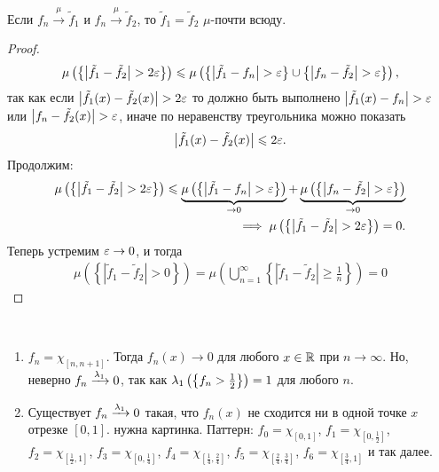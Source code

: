 \begin{remrk}
 Если $f_n \xrightarrow{\mu} \tilde f_1$ и $f_n \xrightarrow{\mu} \tilde f_2$, то $\tilde f_1 = \tilde f_2$  $\mu$-почти всюду.
\end{remrk}
\begin{proof}
 \begin{align*}
  \mu \left( \left\{ \left| \tilde f_1 - \tilde f_2 \right| > 2\varepsilon \right\} \right)\leqslant \mu \left( \left\{ \left| \tilde f_1 - f_n \right| > \varepsilon \right\} \cup \left\{ \left| f_n - \tilde f_2 \right| > \varepsilon \right\} \right)
 ,\end{align*} так как если  $\left| \tilde f_1(x) - \tilde f_2(x) \right| > 2\varepsilon$ то должно быть выполнено $\left| \tilde f_1(x) - f_n \right| > \varepsilon$ или $\left| f_n - \tilde f_2(x) \right| > \varepsilon$, иначе по неравенству треугольника можно показать 
\begin{align*}
\left| \tilde f_1(x) - \tilde f_2(x) \right| \leqslant 2\varepsilon
.\end{align*} Продолжим: \begin{align*}
\mu \left( \left\{ \left| \tilde f_1 - \tilde f_2 \right| > 2\varepsilon \right\} \right) \leqslant \underbrace{\mu\left( \left\{ \left| \tilde f_1 - f_n \right| > \varepsilon \right\} \right)}_{\to 0} + \underbrace{\mu \left( \left\{ \left| f_n - \tilde f_2 \right| > \varepsilon \right\} \right)}_{\to 0} \\
\implies \mu \left( \left\{ \left| \tilde f_1 - \tilde f_2 \right| > 2\varepsilon \right\} \right) = 0
.\end{align*} Теперь устремим $\varepsilon \to 0$, и тогда \begin{align*}
\mu \left( \left\{ \left| \tilde f_1 - \tilde f_2 \right| > 0 \right\} \right) = \mu \left( \bigcup_{n=1}^{\infty} \left\{ \left| \tilde f_1 - \tilde f_2 \right| \geqslant \frac{1}{n}\right\} \right) = 0
\end{align*} 
\end{proof}
\begin{exmpl}\
 \begin{enumerate}
  \item $f_n = \chi_{[n, n + 1]}$. Тогда $f_n(x) \to 0$ для любого $x \in \mathbb{R}$ при $n \to \infty$. Но, неверно $f_n \xrightarrow{\lambda_{1}} 0$, так как $\lambda_{1} \left( \left\{ f_n > \frac{1}{2} \right\} \right) = 1$ для любого $n$.
  \item Существует $f_n \xrightarrow{\lambda_{1}} 0$ такая, что $f_n(x)$ не сходится ни в одной точке  $x$ отрезке $[0, 1]$. {\color{red} нужна картинка}. Паттерн: $f_0 = \chi_{[0,1]}$, $f_1 = \chi_{\left[0, \frac{1}{2}\right]}$, $f_2 = \chi_{\left[ \frac{1}{2}, 1 \right]}$, $f_3 = \chi_{[0, \frac{1}{4}]}$, $f_4 = \chi_{\left[\frac{1}{4}, \frac{2}{4}\right]}$, $f_5 = \chi_{\left[ \frac{2}{4}, \frac{3}{4} \right]}$, $f_6 = \chi_{\left[ \frac{3}{4}, 1 \right]}$ и так далее.
 \end{enumerate}
\end{exmpl}
